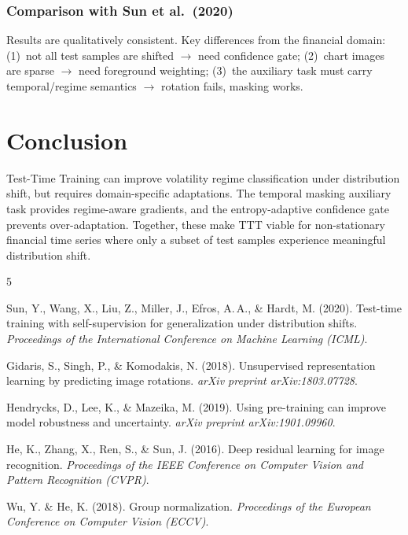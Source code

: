 \documentclass[11pt]{article}
\begin{document}
\subsubsection*{Comparison with Sun et al.\ (2020)}

Results are qualitatively consistent. Key differences from the financial domain:
(1)~not all test samples are shifted $\rightarrow$ need confidence gate;
(2)~chart images are sparse $\rightarrow$ need foreground weighting;
(3)~the auxiliary task must carry temporal/regime semantics $\rightarrow$ rotation fails,
masking works.

\section{Conclusion}
\label{sec:conclusion}

Test-Time Training can improve volatility regime classification under distribution shift,
but requires domain-specific adaptations. The temporal masking auxiliary task provides
regime-aware gradients, and the entropy-adaptive confidence gate prevents
over-adaptation. Together, these make TTT viable for non-stationary financial time series
where only a subset of test samples experience meaningful distribution shift.

\begin{thebibliography}{5}

Sun, Y., Wang, X., Liu, Z., Miller, J., Efros, A.\,A., \& Hardt, M. (2020).
Test-time training with self-supervision for generalization under distribution shifts.
\textit{Proceedings of the International Conference on Machine Learning (ICML)}.

Gidaris, S., Singh, P., \& Komodakis, N. (2018).
Unsupervised representation learning by predicting image rotations.
\textit{arXiv preprint arXiv:1803.07728}.

Hendrycks, D., Lee, K., \& Mazeika, M. (2019).
Using pre-training can improve model robustness and uncertainty.
\textit{arXiv preprint arXiv:1901.09960}.

He, K., Zhang, X., Ren, S., \& Sun, J. (2016).
Deep residual learning for image recognition.
\textit{Proceedings of the IEEE Conference on Computer Vision and Pattern Recognition (CVPR)}.

Wu, Y. \& He, K. (2018).
Group normalization.
\textit{Proceedings of the European Conference on Computer Vision (ECCV)}.

\end{thebibliography}
\end{document}
